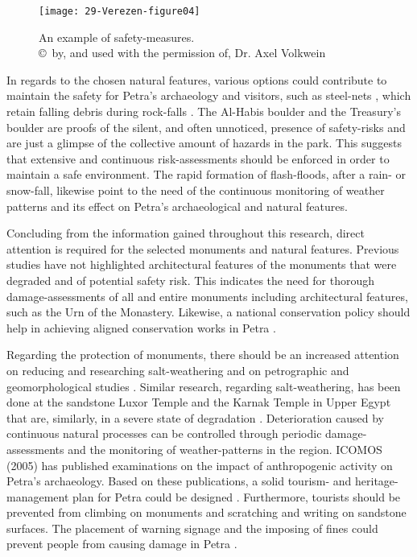 \begin{figure}[!htb]
	\texttt{[image: 29-Verezen-figure04]}
	\caption{An example of safety-measures.
		{\normalfont\scriptsize \\ \copyright\ by, and used with the permission of, Dr. Axel Volkwein
	}}
	\label{fig:29-Verezen-figure04}
\end{figure}

In regards to the chosen natural features, various options could contribute to maintain the safety for Petra’s archaeology and visitors,
such as steel-nets , which retain falling debris during rock-falls \parencite[2638]{volkwein2011}.
The Al-Habis boulder and the Treasury’s boulder  are proofs of the silent, and often unnoticed,
presence of safety-risks and are just a glimpse of the collective amount of hazards in the park.
This suggests that extensive and continuous risk-assessments should be enforced in order to maintain a safe environment.
The rapid formation of flash-floods, after a rain- or snow-fall, likewise point to the need of the continuous monitoring of
weather patterns and its effect on Petra’s archaeological and natural features.

Concluding  from the information gained throughout this research,
direct attention is required for the selected monuments and natural features.
Previous studies have not highlighted architectural features of the monuments that were degraded and of potential safety risk.
This indicates the need for thorough damage-assessments of all and entire monuments including architectural features,
such as the Urn of the Monastery.
Likewise, a national conservation policy should help in achieving aligned conservation works in Petra \parencite[267--284]{balaawi2011}.

Regarding the protection of monuments, there should be an increased attention on reducing and researching salt-weathering and
on petrographic and geomorphological studies \parencite[347--348]{heinrichs2013a}.
Similar research, regarding salt-weathering, has been done at the sandstone Luxor Temple and
the Karnak Temple in Upper Egypt that are, similarly, in a severe state of degradation \parencite[1009--1102]{fhb03}.
Deterioration caused by continuous natural processes can be controlled through periodic damage-assessments and
the monitoring of weather-patterns in the region.
ICOMOS (2005) has published examinations on the impact of anthropogenic activity on Petra’s archaeology.
Based on these publications, a solid tourism- and
heritage-management plan for Petra could be designed \parencite[499--501]{comer2011}.
Furthermore, tourists should be prevented from climbing on monuments and scratching and writing on sandstone surfaces.
The placement of warning signage and the imposing of fines could prevent people from causing damage in
Petra \parencite[80--85]{mustafa2013}. 

